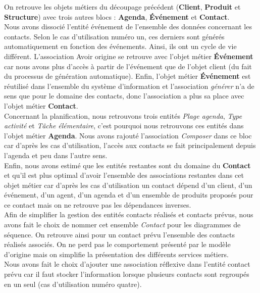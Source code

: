 On retrouve les objets métiers du découpage précédent (\textbf{Client}, \textbf{Produit} et \textbf{Structure}) avec trois autres blocs : \textbf{Agenda}, \textbf{Événement} et \textbf{Contact}. \\

Nous avons dissocié l'entité événement de l'ensemble des données concernant les contacts. Selon le cas d'utilisation numéro un, ces derniers sont générés automatiquement en fonction des événements. Ainsi, ils ont un cycle de vie différent. L'association \og Avoir origine \fg{} se retrouve avec l'objet métier \textbf{Événement} car nous avons plus d'accès à partir de l'événement que de l'objet client (du fait du processus de génération automatique). Enfin, l'objet métier \textbf{Événement} est réutilisé dans l'ensemble du système d'information et l'association \textit{générer} n'a de sens que pour le domaine des contacts, donc l'association a plus sa place avec l'objet métier \textbf{Contact}. \\

Concernant la planification, nous retrouvons trois entités \textit{Plage agenda}, \textit{Type activité} et \textit{Tâche élémentaire}, c'est pourquoi nous retrouvons ces entités dans l'objet métier \textbf{Agenda}. Nous avons rajouté l'association \textit{Composer} dans ce bloc car d'après les cas d'utilisation, l'accès aux contacts se fait principalement depuis l'agenda et peu dans l'autre sens. \\

Enfin, nous avons estimé que les entités restantes sont du domaine du \textbf{Contact} et qu'il est plus optimal d'avoir l'ensemble des associations restantes dans cet objet métier car d'après les cas d'utilisation un contact dépend d'un client, d'un événement, d'un agent, d'un agenda et d'un ensemble de produits proposés pour ce contact mais on ne retrouve pas les dépendances inverses. \\

Afin de simplifier la gestion des entités contacts réalisés et contacts prévus, nous avons fait le choix de nommer cet ensemble \textit{Contact} pour les diagrammes de séquence. On retrouve ainsi pour un contact prévu l'ensemble des contacts réalisés associés. On ne perd pas le comportement présenté par le modèle d'origine mais on simplifie la présentation des différents services métiers. \\

Nous avons fait le choix d'ajouter une association réflexive dans l'entité contact prévu car il faut stocker l'information lorsque plusieurs contacts sont regroupés en un seul (cas d'utilisation numéro quatre). \\

